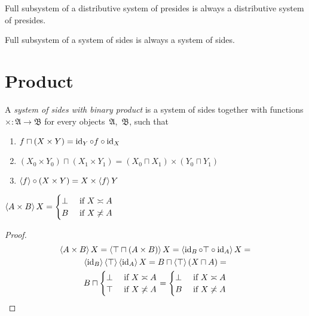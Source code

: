 \begin{obvious}
Full subsystem of a distributive system of presides is always a distributive system of presides.
\end{obvious}

\begin{obvious}
Full subsystem of a system of sides is always a system of sides.
\end{obvious}


\section{Product}

\begin{defn}
A \emph{system of sides with binary product} is a system of sides together with functions $\mathord{\times}:\mathfrak{A}\rightarrow\mathfrak{B}$
for every objects~$\mathfrak{A}$,~$\mathfrak{B}$, such that
\begin{enumerate}
\item \label{f-c-x-y}$f\sqcap(X\times Y) = \operatorname{id}_Y\circ f\circ\operatorname{id}_X$
\item \label{f-xy-x0y0}$(X_0\times Y_0)\sqcap(X_1\times Y_1) = (X_0\sqcap X_1)\times(Y_0\sqcap Y_1)$
\item $\left\langle f\right\rangle\circ(X\times Y) = X\times\left\langle f\right\rangle Y$
\end{enumerate}
\end{defn}

\begin{prop}
$\left\langle A\times B\right\rangle X = \begin{cases}\bot&\text{ if }X\asymp A\\B&\text{ if }X\not\asymp A\end{cases}$
\end{prop}

\begin{proof}
~
\begin{multline*}
\left\langle A\times B\right\rangle X = \left\langle \top\sqcap(A\times B)\right\rangle X = \left\langle \operatorname{id}_B\circ\top\circ\operatorname{id}_A\right\rangle X = \\
\left\langle \operatorname{id}_B\right\rangle\left\langle \top\right\rangle\left\langle \operatorname{id}_A\right\rangle X =
B\sqcap\left\langle \top\right\rangle(X\sqcap A) = \\
B\sqcap\begin{cases}\bot&\text{ if }X\asymp A\\\top&\text{ if }X\not\asymp A\end{cases} =
\begin{cases}\bot&\text{ if }X\asymp A\\B&\text{ if }X\not\asymp A\end{cases}
\end{multline*}
\end{proof}

